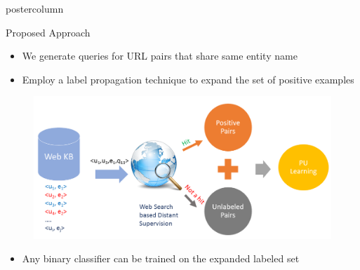 \documentclass{beamer}
\begin{document}
\begin{frame}
\begin{columns}
\begin{column}{.5\textwidth}
\begin{beamercolorbox}[center]{postercolumn}
\begin{minipage}{.98\textwidth}
{\begin{myblock}{Proposed Approach}
              \begin{itemize}
		\item  We generate queries for URL pairs that share same entity name
		\item  Employ a label propagation technique to expand the set of positive examples
     \end{itemize}     
						\vspace{0.5em}
						\begin{figure}
							\begin{minipage}{0.94\textwidth}
								\centering\includegraphics[height=0.7\textwidth, width=1\textwidth, keepaspectratio]{img/FlowWWW1.png}
							\end{minipage}
						\vspace{0.5em}

						\end{figure}
             \begin{itemize}
		\item Any binary classifier can be trained on the expanded labeled set 
     \end{itemize}     
					\end{myblock}\vfill

}
\end{minipage}
\end{beamercolorbox}
\end{column}
\end{columns}
\end{frame}
\end{document}
